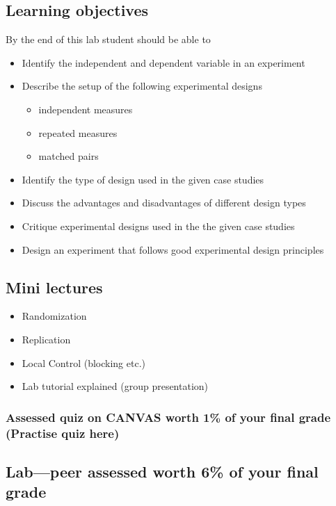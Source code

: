 \documentclass{article}
\begin{document}
\subsection*{Learning objectives}
By the end of this lab student should be able to
\begin{itemize}
  \item Identify the independent and dependent variable in an experiment
\item Describe the setup of the following experimental designs
  \begin{itemize}
  \item independent measures
  \item repeated measures
  \item matched pairs
  \end{itemize}
\item Identify the type of design used in the given case studies
\item Discuss the advantages and disadvantages of different design types
\item Critique experimental designs used in the the given case studies
\item Design an experiment that follows good experimental design principles
\end{itemize}

\subsection*{Mini lectures}

\begin{itemize}
\item Randomization
\item Replication
\item Local Control (blocking etc.)
\item Lab tutorial explained (group presentation)
\end{itemize}

\subsubsection*{Assessed quiz on CANVAS worth 1\% of your final grade (Practise quiz here)}

\subsection*{Lab---peer assessed worth 6\% of your final grade}
\end{document}
